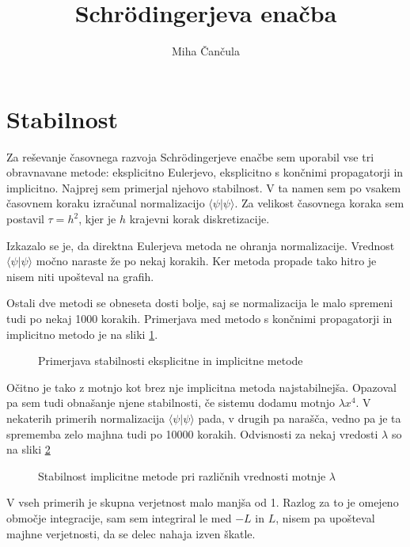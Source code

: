\documentclass[a4paper,10pt]{article}
\title{Schr\"odingerjeva ena\v cba}
\author{Miha \v Can\v cula}
\begin{document}
\maketitle

\section{Stabilnost}

Za reševanje časovnega razvoja Schr\"odingerjeve enačbe sem uporabil vse tri obravnavane metode: eksplicitno Eulerjevo, eksplicitno s končnimi propagatorji in implicitno. 
Najprej sem primerjal njehovo stabilnost. V ta namen sem po vsakem časovnem koraku izračunal normalizacijo $\langle\psi|\psi\rangle$. 
Za velikost časovnega koraka sem postavil $\tau=h^{2}$, kjer je $h$ krajevni korak diskretizacije. 

Izkazalo se je, da direktna Eulerjeva metoda ne ohranja normalizacije. 
Vrednost $\langle\psi|\psi\rangle$ močno naraste že po nekaj korakih. 
Ker metoda propade tako hitro je nisem niti upošteval na grafih. 

Ostali dve metodi se obneseta dosti bolje, saj se normalizacija le malo spremeni tudi po nekaj 1000 korakih. 
Primerjava med metodo s končnimi propagatorji in implicitno metodo je na sliki \ref{fig:stabilnost}.

\begin{figure}[h]

\caption{Primerjava stabilnosti eksplicitne in implicitne metode}
\label{fig:stabilnost} 
\end{figure}

Očitno je tako z motnjo kot brez nje implicitna metoda najstabilnejša. 
Opazoval pa sem tudi obnašanje njene stabilnosti, če sistemu dodamu motnjo $\lambda x^{4}$.
V nekaterih primerih normalizacija $\langle\psi|\psi\rangle$ pada, v drugih pa narašča, vedno pa je ta sprememba zelo majhna tudi po 10000 korakih. 
Odvisnosti za nekaj vredosti $\lambda$ so na sliki \ref{fig:stabilnost-imp}

\begin{figure}[h]

\caption{Stabilnost implicitne metode pri različnih vrednosti motnje $\lambda$}
\label{fig:stabilnost-imp} 
\end{figure}

V vseh primerih je skupna verjetnost malo manjša od 1. 
Razlog za to je omejeno območje integracije, sam sem integriral le med $-L$ in $L$, nisem pa upošteval majhne verjetnosti, da se delec nahaja izven škatle. 
\end{document}
